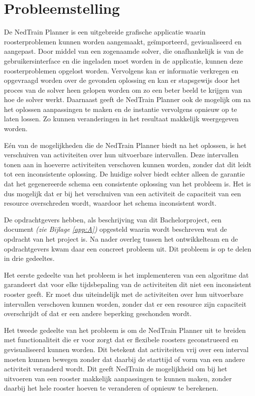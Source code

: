 \section{Probleemstelling}
\label{sec:probleemstelling}

De NedTrain Planner is een uitgebreide grafische applicatie waarin roosterproblemen kunnen worden aangemaakt, ge\"importeerd, gevisualiseerd en aangepast. Door middel van een zogenaamde solver, die onafhankelijk is van de gebruikersinterface en die ingeladen moet worden in de applicatie, kunnen deze roosterproblemen opgelost worden. Vervolgens kan er informatie verkregen en opgevraagd worden over de gevonden oplossing en kan er stapsgewijs door het proces van de solver heen gelopen worden om zo een beter beeld te krijgen van hoe de solver werkt. Daarnaast geeft de NedTrain Planner ook de mogelijk om na het oplossen aanpassingen te maken en de instantie vervolgens opnieuw op te laten lossen. Zo kunnen veranderingen in het resultaat makkelijk weergegeven worden.

E\'en van de mogelijkheden die de NedTrain Planner biedt na het oplossen, is het verschuiven van activiteiten over hun uitvoerbare intervallen. Deze intervallen tonen aan in hoeverre activiteiten verschoven kunnen worden, zonder dat dit leidt tot een inconsistente oplossing. De huidige solver biedt echter alleen de garantie dat het gegenereerde schema een consistente oplossing  van het probleem is. Het is dus mogelijk dat er bij het verschuiven van een activiteit de capaciteit van een resource overschreden wordt, waardoor het schema inconsistent wordt.

De opdrachtgevers hebben, als beschrijving van dit Bachelorproject, een document \emph{(zie Bijlage \ref{app:A})} opgesteld waarin wordt beschreven wat de opdracht van het project is. Na nader overleg tussen het ontwikkelteam en de opdrachtgevers kwam daar een concreet probleem uit. Dit probleem is op te delen in drie gedeeltes. 

Het eerste gedeelte van het probleem is het implementeren van een algoritme dat garandeert dat voor elke tijdsbepaling van de activiteiten dit niet een inconsistent rooster geeft. Er moet dus uiteindelijk met de activiteiten over hun uitvoerbare intervallen verschoven kunnen worden, zonder dat er een resource zijn capaciteit overschrijdt of dat er een andere beperking geschonden wordt.

Het tweede gedeelte van het probleem is om de NedTrain Planner uit te breiden met functionaliteit die er voor zorgt dat er flexibele roosters geconstrueerd en gevisualiseerd kunnen worden. Dit betekent dat activiteiten vrij over een interval moeten kunnen bewegen zonder dat daarbij de starttijd of vorm van een andere activiteit veranderd wordt. Dit geeft NedTrain de mogelijkheid om bij het uitvoeren van een rooster makkelijk aanpassingen te kunnen maken, zonder daarbij het hele rooster hoeven te veranderen of opnieuw te berekenen.

